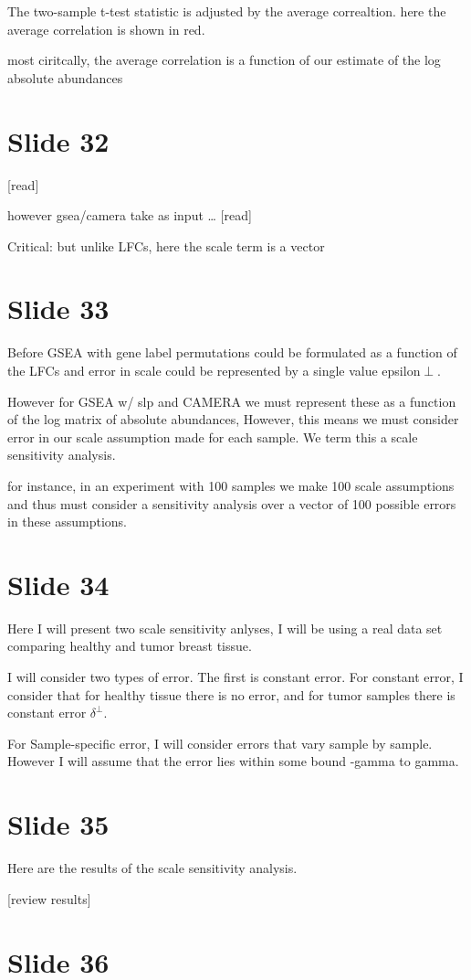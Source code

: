 \documentclass[11pt]{article}
\begin{document}
The two-sample t-test statistic is adjusted by the average correaltion. here the average correlation is shown
in red.

most ciritcally, the average correlation is a function of our estimate of the log absolute abundances

\section{Slide 32}
\label{sec:org0729f99}

[read]

however gsea/camera take as input \ldots{} [read]

Critical: but unlike LFCs, here the scale term is a vector

\section{Slide 33}
\label{sec:org421351e}

Before GSEA with gene label permutations could be formulated as a function of the LFCs
and error in scale could be represented by a single value epsilon\(\perp\).

However for GSEA w/ slp and CAMERA we must represent these as a function of the log
matrix of absolute abundances, However, this means we must consider error in our scale
assumption made for each sample. We term this a scale sensitivity analysis. 

for instance, in an experiment with 100 samples we make 100 scale assumptions and thus
must consider a sensitivity analysis over a vector of 100 possible errors in these assumptions.

\section{Slide 34}
\label{sec:orgf920d2c}

Here I will present two scale sensitivity anlyses, I will be using a real data set comparing healthy and
tumor breast tissue.

I will consider two types of error. The first is constant error. For constant error, I consider that
for healthy tissue there is no error, and for tumor samples there is constant error \(\delta^\perp\).

For Sample-specific error, I will consider errors that vary sample by sample. However I will assume that
the error lies within some bound -gamma to gamma.

\section{Slide 35}
\label{sec:org906f7ce}

Here are the results of the scale sensitivity analysis.

[review results]

\section{Slide 36}
\label{sec:org95d106f}
\end{document}
